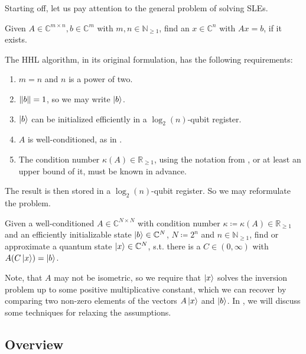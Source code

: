 Starting off, let us pay attention to the general problem of solving SLEs.
\begin{problem}
    Given \(A \in \mathbb{C}^{m \times n}, b \in \mathbb{C}^m\) with \(m, n \in \mathbb{N}_{\geq 1}\), find an \(x \in \mathbb{C}^n\) with \(Ax = b\), if it exists.
\end{problem}
The HHL algorithm, in its original formulation, has the following requirements:
\begin{enumerate}
    \item \(m = n\) and \(n\) is a power of two.
    \item \(\norm{b} = 1\), so we may write \(\ket{b}\).
    \item \(\ket{b}\) can be initialized efficiently in a \(\log_2(n)\)-qubit register.
    \item \(A\) is well-conditioned, as in .
    \item The condition number \(\kappa(A) \in \mathbb{R}_{\geq 1}\), using the notation from , or at least an upper bound of it, must be known in advance.
\end{enumerate}
The result is then stored in a \(\log_2(n)\)-qubit register. So we may reformulate the problem.
\begin{problem} \label{hhl_problem}
    Given a well-conditioned \(A \in \mathbb{C}^{N \times N}\) with condition number \(\kappa \coloneqq \kappa(A) \in \mathbb{R}_{\geq 1}\) and an efficiently initializable state \(\ket{b} \in \mathbb{C}^N\), \(N \coloneqq 2^n\) and \(n \in \mathbb{N}_{\geq 1}\), find or approximate a quantum state \(\ket{x} \in \mathbb{C}^N\), s.t. there is a \(C \in (0, \infty)\) with \(A(C\ket{x}) = \ket{b}\).
\end{problem}
Note, that \(A\) may not be isometric, so we require that \(\ket{x}\) solves the inversion problem up to some positive multiplicative constant, which we can recover by comparing two non-zero elements of the vectors \(A\ket{x}\) and \(\ket{b}\). In , we will discuss some techniques for relaxing the assumptions.

\subsection{Overview }

